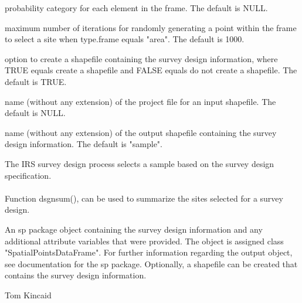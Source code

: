\begin{Arguments}
\begin{ldescription}
probability category for each element in the frame.  The default is
NULL.
\item[\code{maxtry}] maximum number of iterations for randomly generating a point
within the frame to select a site when type.frame equals "area".  The
default is 1000.
\item[\code{shapefile}] option to create a shapefile containing the survey design
information, where TRUE equals create a shapefile and FALSE equals do not
create a shapefile.  The default is TRUE.
\item[\code{prjfilename}] name (without any extension) of the project file for an
input shapefile.  The default is NULL.
\item[\code{out.shape}] name (without any extension) of the output shapefile
containing the survey design information.  The default is "sample".
\end{ldescription}
\end{Arguments}
\begin{Details}\relax
The IRS survey design process selects a sample based on the survey design 
specification.\\\\
Function dsgnsum(), can be used to summarize the sites selected for a survey
design.
\end{Details}
\begin{Value}
An sp package object containing the survey design information and any
additional attribute variables that were provided.  The object is assigned
class "SpatialPointsDataFrame".  For further information regarding the
output object, see documentation for the sp package.  Optionally, a
shapefile can be created that contains the survey design information.
\end{Value}
\begin{Author}\relax
Tom Kincaid 
\end{Author}
\begin{SeeAlso}\relax
{}
\end{SeeAlso}
